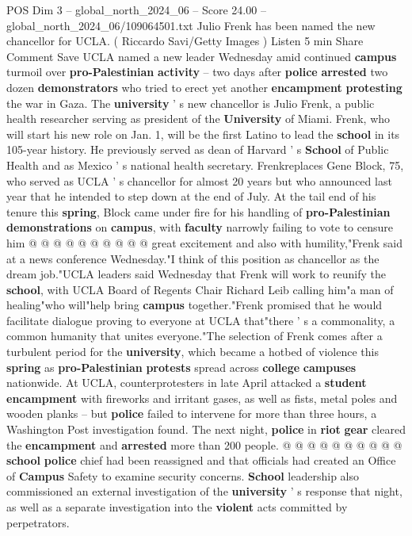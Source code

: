 \begin{textsample}{POS Dim 3 – global\_north\_2024\_06 – Score 24.00 – global\_north\_2024\_06/109064501.txt}  \label{ex:f3_pos_063}
Julio Frenk has been named the new chancellor for UCLA. ( Riccardo Savi/Getty Images ) Listen 5 min Share Comment Save UCLA named a new leader Wednesday amid continued \textbf{campus} turmoil over \textbf{pro-Palestinian} \textbf{activity} -- two days after \textbf{police} \textbf{arrested} two dozen \textbf{demonstrators} who tried to erect yet another \textbf{encampment} \textbf{protesting} the war in Gaza.
The \textbf{university} ' s new chancellor is Julio Frenk, a public health researcher serving as president of the \textbf{University} of Miami.
Frenk, who will start his new role on Jan. 1, will be the first Latino to lead the \textbf{school} in its 105-year history.
He previously served as dean of Harvard ' s \textbf{School} of Public Health and as Mexico ' s national health secretary.
Frenkreplaces Gene Block, 75, who served as UCLA ' s chancellor for almost 20 years but who announced last year that he intended to step down at the end of July.
At the tail end of his tenure this \textbf{spring}, Block came under fire for his handling of \textbf{pro-Palestinian} \textbf{demonstrations} on \textbf{campus}, with \textbf{faculty} narrowly failing to vote to censure him @ @ @ @ @ @ @ @ @ @ great excitement and also with humility,"Frenk said at a news conference Wednesday."I think of this position as chancellor as the dream job."UCLA leaders said Wednesday that Frenk will work to reunify the \textbf{school}, with UCLA Board of Regents Chair Richard Leib calling him"a man of healing"who will"help bring \textbf{campus} together."Frenk promised that he would facilitate dialogue proving to everyone at UCLA that"there ' s a commonality, a common humanity that unites everyone."The selection of Frenk comes after a turbulent period for the \textbf{university}, which became a hotbed of violence this \textbf{spring} as \textbf{pro-Palestinian} \textbf{protests} spread across \textbf{college} \textbf{campuses} nationwide.
At UCLA, counterprotesters in late April attacked a \textbf{student} \textbf{encampment} with fireworks and irritant gases, as well as fists, metal poles and wooden planks -- but \textbf{police} failed to intervene for more than three hours, a Washington Post investigation found.
The next night, \textbf{police} in \textbf{riot} \textbf{gear} cleared the \textbf{encampment} and \textbf{arrested} more than 200 people. @ @ @ @ @ @ @ @ @ @ \textbf{school} \textbf{police} chief had been reassigned and that officials had created an Office of \textbf{Campus} Safety to examine security concerns. \textbf{School} leadership also commissioned an external investigation of the \textbf{university} ' s response that night, as well as a separate investigation into the \textbf{violent} acts committed by perpetrators.

\end{textsample}

